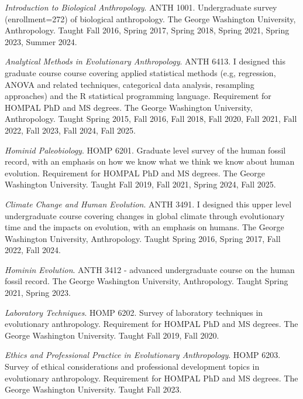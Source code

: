 \documentclass{article}
\newenvironment{mylist}
{\begin{description}[style=unboxed,leftmargin=1.3cm]}
{\end{description}}
\begin{document}
\begin{mylist}

\item[]\emph{Introduction to Biological Anthropology}. ANTH 1001. Undergraduate survey (enrollment=272) of biological anthropology. The George Washington University, Anthropology. Taught Fall 2016, Spring 2017, Spring 2018, Spring 2021, Spring 2023, Summer 2024.

\item[] \emph{Analytical Methods in Evolutionary Anthropology}. ANTH 6413. I designed this graduate course course covering applied statistical methods (e.g, regression, ANOVA and related techniques, categorical data analysis, resampling approaches) and the R statistical programming language. Requirement for HOMPAL PhD and MS degrees. The George Washington University, Anthropology. Taught Spring 2015, Fall 2016, Fall 2018, Fall 2020, Fall 2021, Fall 2022, Fall 2023, Fall 2024, Fall 2025.

\item[] \emph{Hominid Paleobiology}. HOMP 6201. Graduate level survey of the human fossil record, with an emphasis on how we know what we think we know about human evolution. Requirement for HOMPAL PhD and MS degrees.    The George Washington University. Taught Fall 2019, Fall 2021, Spring 2024, Fall 2025.

\item[] \emph{Climate Change and Human Evolution}. ANTH 3491. I designed this upper level undergraduate course covering changes in global climate through evolutionary time and the impacts on evolution, with an emphasis on humans. The George Washington University, Anthropology. Taught Spring 2016, Spring 2017, Fall 2022, Fall 2024. 

\item[] \emph{Hominin Evolution}. ANTH 3412 - advanced undergraduate course on the human fossil record. The George Washington University, Anthropology. Taught Spring 2021, Spring 2023.

\item[] \emph{Laboratory Techniques}. HOMP 6202. Survey of laboratory techniques in evolutionary anthropology. Requirement for HOMPAL PhD and MS degrees. The George Washington University. Taught Fall 2019, Fall 2020. 

\item[] \emph{Ethics and Professional Practice in Evolutionary Anthropology}. HOMP 6203. Survey of ethical considerations and professional development topics in evolutionary anthropology. Requirement for HOMPAL PhD and MS degrees. The George Washington University. Taught Fall 2023.


\end{mylist}
\end{document}

